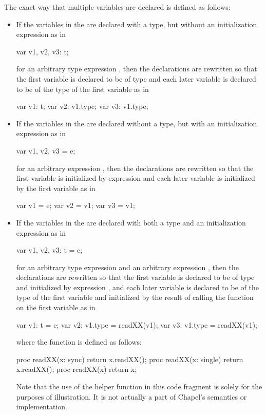 The exact way that multiple variables are declared is defined as
follows:
\begin{itemize}
\item If the variables in the  are declared
with a type, but without an initialization expression as in
\begin{chapel}
var v1, v2, v3: t;
\end{chapel}
for an arbitrary type expression , then the declarations are
rewritten so that the first variable is declared to be of
type  and each later variable is declared to be of the type of
the first variable as in
\begin{chapel}
var v1: t; var v2: v1.type; var v3: v1.type;
\end{chapel}

\item If the variables in the  are declared
without a type, but with an initialization expression as in
\begin{chapel}
var v1, v2, v3 = e;
\end{chapel}
for an arbitrary expression , then the declarations are
rewritten so that the first variable is initialized by
expression  and each later variable is initialized by the
first variable as in
\begin{chapel}
var v1 = e; var v2 = v1; var v3 = v1;
\end{chapel}

\item If the variables in the  are declared
with both a type and an initialization expression as in
\begin{chapel}
var v1, v2, v3: t = e;
\end{chapel}
for an arbitrary type expression  and an arbitrary
expression , then the declarations are rewritten so that the
first variable is declared to be of type  and initialized by
expression , and each later variable is declared to be of the
type of the first variable and initialized by the result of calling
the function  on the first variable as in
\begin{chapel}
var v1: t = e; var v2: v1.type = readXX(v1); var v3: v1.type = readXX(v1);
\end{chapel}
where the function  is defined as follows:
\begin{chapel}
proc readXX(x: sync) return x.readXX();
proc readXX(x: single) return x.readXX();
proc readXX(x) return x;
\end{chapel}
Note that the use of the helper function 
in this code fragment is solely for the purposes of illustration.
It is not actually a part of Chapel's semantics or implementation.
\end{itemize}

